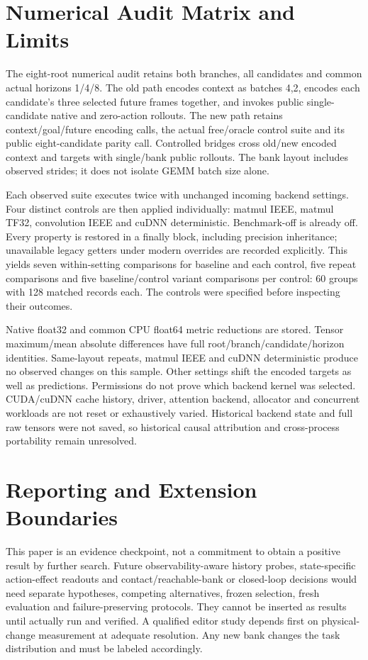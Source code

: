 \section{Numerical Audit Matrix and Limits}
\label{app:numerics}

The eight-root numerical audit retains both branches, all candidates and
common actual horizons 1/4/8. The old path encodes context as batches 4,2,
encodes each candidate's three selected future frames together, and invokes
public single-candidate native and zero-action rollouts. The new path retains
context/goal/future encoding calls, the actual free/oracle control suite and
its public eight-candidate parity call. Controlled bridges cross old/new
encoded context and targets with single/bank public rollouts. The bank layout
includes observed strides; it does not isolate GEMM batch size alone.

Each observed suite executes twice with unchanged incoming backend settings.
Four distinct controls are then applied individually: matmul IEEE, matmul TF32,
convolution IEEE and cuDNN deterministic. Benchmark-off is already off. Every
property is restored in a finally block, including precision inheritance;
unavailable legacy getters under modern overrides are recorded explicitly.
This yields seven within-setting comparisons for baseline and each control,
five repeat comparisons and five baseline/control variant comparisons per
control: 60 groups with 128 matched records each. The controls were specified
before inspecting their outcomes.

Native float32 and common CPU float64 metric reductions are stored. Tensor
maximum/mean absolute differences have full root/branch/candidate/horizon
identities. Same-layout repeats, matmul IEEE and cuDNN deterministic produce
no observed changes on this sample. Other settings shift the encoded targets
as well as predictions. Permissions do not prove which backend kernel was
selected. CUDA/cuDNN cache history, driver, attention backend, allocator and
concurrent workloads are not reset or exhaustively varied. Historical
backend state and full raw tensors were not saved, so historical causal
attribution and cross-process portability remain unresolved.

\section{Reporting and Extension Boundaries}
\label{app:extension}

This paper is an evidence checkpoint, not a commitment to obtain a positive
result by further search. Future observability-aware history probes,
state-specific action-effect readouts and contact/reachable-bank or closed-loop
decisions would need separate hypotheses, competing alternatives, frozen
selection, fresh evaluation and failure-preserving protocols. They cannot be
inserted as results until actually run and verified. A qualified editor study
depends first on physical-change measurement at adequate resolution. Any
new bank changes the task distribution and must be labeled accordingly.

